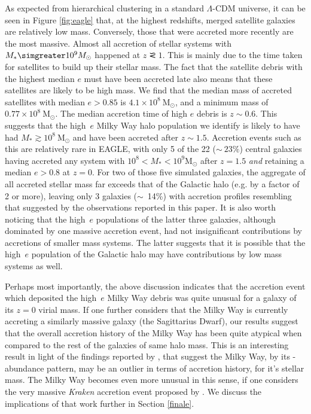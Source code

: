 As expected from hierarchical clustering in a standard $\Lambda$-CDM
universe, it can be seen in Figure \ref{fig:eagle} that, at the
highest redshifts, merged satellite galaxies are relatively low
mass.  Conversely, those that were accreted more recently are the
most massive. Almost all accretion of stellar systems with $M_*
\simgreater 10^9 M_\odot$ happened at $z \simless 1$.  This is
mainly due to the time taken for satellites to build up their stellar
mass. The fact that the satellite debris with the highest median
$e$ must have been accreted late also means that these satellites
are likely to be high mass. We find that the median mass of accreted
satellites with median $e>0.85$ is $4.1\times 10^{8}\ \mathrm{M_{\odot}}$,
and a minimum mass of $0.77 \times 10^{8}\ \mathrm{M_{\odot}}$. The
median accretion time of high $e$ debris is $z \sim 0.6$. This
suggests that the high~$e$ Milky Way halo population we identify
is likely to have had  $M_* \gtrsim 10^{8}\ \mathrm{M_{\odot}}$ and
have been accreted after $z\sim 1.5$.  Accretion events such as
this are relatively rare in EAGLE, with only 5 of the 22 ($\sim~23\%$)
central galaxies having accreted any system with $10^8 < M_* < 10^9
\mathrm{M_{\odot}}$ after $z=1.5$ \emph{and} retaining a median $e > 0.8$ at $z=0$.  For
two of those five simulated galaxies, the aggregate of all accreted
stellar mass far exceeds that of the Galactic halo (e.g. by a factor of 2 or more), leaving only 3
galaxies ($\sim$~14\%) with accretion profiles resembling that
suggested by the observations reported in this paper.  It is also
worth noticing that the high~$e$ populations of the latter three
galaxies, although dominated by one massive accretion event, had
not insignificant contributions by accretions of smaller mass
systems.  The latter suggests that it is possible that the high~$e$
population of the Galactic halo may have contributions by low
mass systems as well.

Perhaps most importantly, the above discussion indicates that the
accretion event which deposited the high~$e$ Milky Way debris was
quite unusual for a galaxy of its $z=0$ virial mass.  If one further
considers that the Milky Way is currently accreting a similarly
massive galaxy (the Sagittarius Dwarf), our results suggest that
the overall accretion history of the Milky Way has been quite
atypical when compared to the rest of the galaxies of same halo
mass. This is an interesting result in light of the findings reported
by \citet{2018MNRAS.477.5072M}, that suggest the Milky Way, by its \afe{}-\feh{} abundance
pattern, may be an outlier in terms of accretion
history, for it's stellar mass. The Milky Way becomes even more
unusual in this sense, if one considers the very massive \emph{Kraken}
accretion event proposed by \citet{2018MNRAS.tmp.1537K}. We discuss
the implications of that work further in Section \ref{finale}.

